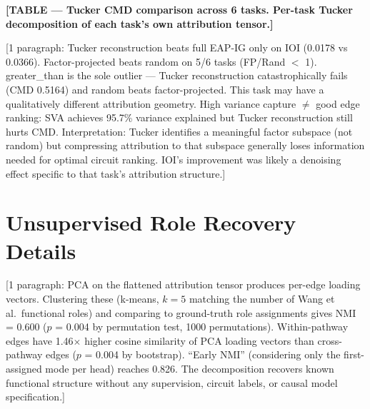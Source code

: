 \documentclass[11pt]{article}
\begin{document}
\textbf{[TABLE --- Tucker CMD comparison across 6 tasks. Per-task Tucker
decomposition of each task's own attribution tensor.]}


[1 paragraph: Tucker reconstruction beats full EAP-IG only on IOI
(0.0178 vs 0.0366). Factor-projected beats random on 5/6 tasks
(FP/Rand $<$ 1). greater\_than is the sole outlier --- Tucker
reconstruction catastrophically fails (CMD 0.5164) and random beats
factor-projected. This task may have a qualitatively different
attribution geometry. High variance capture $\neq$ good edge ranking:
SVA achieves 95.7\% variance explained but Tucker reconstruction still
hurts CMD. Interpretation: Tucker identifies a meaningful factor
subspace (not random) but compressing attribution to that subspace
generally loses information needed for optimal circuit ranking. IOI's
improvement was likely a denoising effect specific to that task's
attribution structure.]



\section{Unsupervised Role Recovery Details}
\label{app:nmi_recovery}


[1 paragraph: PCA on the flattened attribution tensor produces per-edge
loading vectors. Clustering these (k-means, $k=5$ matching the number of
Wang et al.\ functional roles) and comparing to ground-truth role
assignments gives NMI = 0.600 ($p$ = 0.004 by permutation test, 1000
permutations). Within-pathway edges have 1.46$\times$ higher cosine
similarity of PCA loading vectors than cross-pathway edges ($p$ = 0.004
by bootstrap). ``Early NMI'' (considering only the first-assigned mode
per head) reaches 0.826. The decomposition recovers known functional
structure without any supervision, circuit labels, or causal model
specification.]
\end{document}
